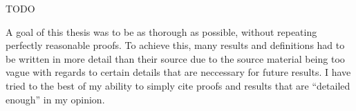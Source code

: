 TODO

A goal of this thesis was to be as thorough as possible, without repeating perfectly reasonable proofs. To achieve this, many results and definitions had to be written in more detail than their source due to the source material being too vague with regards to certain details that are neccessary for future results. I have tried to the best of my ability to simply cite proofs and results that are ``detailed enough'' in my opinion.
